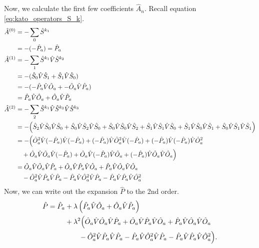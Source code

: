 Now, we calculate the first few coefficients $\hat A _{n}$. Recall
equation \eqref{eq:kato_operators_S_k}.
\begin{align}
  \hat A ^{(0)} &= - \sum _{0} \hat S ^{k _{1}} \\
  &= - (- \hat P _{a}) = \hat P _{a} \\
  \hat A ^{(1)} &= - \sum _{1} \hat S ^{k _{1}} \hat V \hat S ^{k _{2}} \\
  &= - (\hat S _{0} \hat V \hat S _{1} + \hat S _{1} \hat V \hat S _{0}) \\
  &= - (- \hat P _{a} \hat V \hat O _{a} + - \hat O _{a} \hat V \hat P _{a}) \\
  &= \hat P _{a} \hat V \hat O _{a} + \hat O _{a} \hat V \hat P _{a} \\
  \hat A ^{(2)} &= - \sum _{2} \hat S ^{k _{1}} \hat V \hat S ^{k _{2}}
  \hat V \hat S ^{k _{3}} \\
  &= - \Big(
    \hat S _{2} \hat V \hat S _{0} \hat V \hat S _{0}
    + \hat S _{0} \hat V \hat S _{2} \hat V \hat S _{0}
    + \hat S _{0} \hat V \hat S _{0} \hat V \hat S _{2}
    + \hat S _{1} \hat V \hat S _{1} \hat V \hat S _{0}
    + \hat S _{1} \hat V \hat S _{0} \hat V \hat S _{1}
    + \hat S _{0} \hat V \hat S _{1} \hat V \hat S _{1}
  \Big) \notag \\
  &= - \Big(
    \hat O _{a}^{2} \hat V (-\hat P _{a}) \hat V (-\hat P _{a})
    + (-\hat P _{a}) \hat V \hat O _{a}^{2} \hat V (-\hat P _{a})
    + (-\hat P _{a}) \hat V (-\hat P _{a}) \hat V \hat O _{a}^{2} \notag \\
    &\quad + \hat O _{a} \hat V \hat O _{a} \hat V (-\hat P _{a})
    + \hat O _{a} \hat V (-\hat P _{a}) \hat V \hat O _{a}
    + (-\hat P _{a}) \hat V \hat O _{a} \hat V \hat O _{a}
  \Big) \\
  &=\hat O _{a} \hat V \hat O _{a} \hat V \hat P _{a}
  + \hat O _{a} \hat V \hat P _{a} \hat V \hat O _{a}
  + \hat P _{a} \hat V \hat O _{a} \hat V \hat O _{a} \\
  &\quad
  - \hat O _{a}^{2} \hat V \hat P _{a} \hat V \hat P _{a}
  - \hat P _{a} \hat V \hat O _{a}^{2} \hat V \hat P _{a}
  - \hat P _{a} \hat V \hat P _{a} \hat V \hat O _{a}^{2}
\end{align}
Now, we can write out the expansion $\hat P$ to the 2nd order.
\begin{align}
  \hat P = \hat P_a
  &+ \lambda\left(\hat P_a \hat V \hat O_a + \hat O_a \hat V \hat
  P_a\right) \notag\\
  &
  + \lambda^{2}\Big(
    \hat O_a \hat V \hat O_a \hat V \hat P_a
    + \hat O_a \hat V \hat P_a \hat V \hat O_a
    + \hat P_a \hat V \hat O_a \hat V \hat O_a \notag\\
    &\qquad
    - \hat O_a^{2} \hat V \hat P_a \hat V \hat P_a
    - \hat P_a \hat V \hat O_a^{2} \hat V \hat P_a
    - \hat P_a \hat V \hat P_a \hat V \hat O_a^{2}
  \Big).
\end{align}

